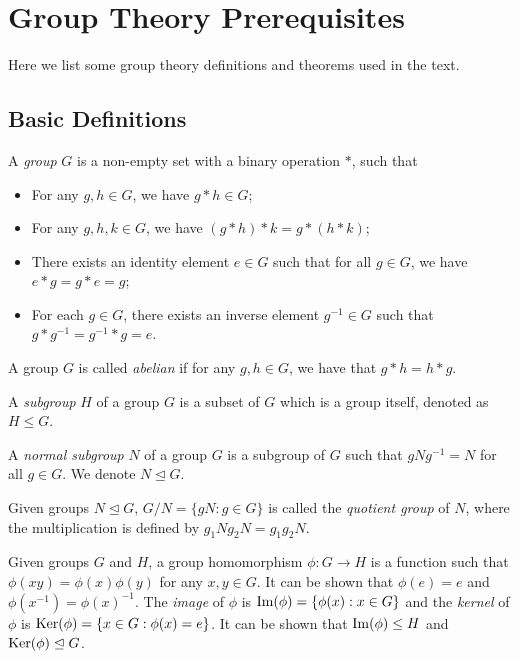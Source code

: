 \section{Group Theory Prerequisites}
Here we list some group theory definitions and theorems used in the text.

\subsection{Basic Definitions}
\begin{definition}
	A \textit{group} $G$ is a non-empty set with a binary operation $*$, such that
	\begin{itemize}
		\item For any $g, h \in G$, we have $g * h \in G$;
		\item For any $g, h, k  \in G$, we have $(g * h) * k = g * (h * k)$;
		\item There exists an identity element $e \in G$ such that for all $g \in G$, we have $e * g = g * e = g$;
		\item For each $g \in G$, there exists an inverse element $g^{-1} \in G$ such that $g * g^{-1} = g^{-1} * g = e$. 
	\end{itemize}
\end{definition}

\begin{definition}
	A group $G$ is called \textit{abelian} if for any $g, h \in G$, we have that $g * h = h * g$. 
\end{definition}

\begin{definition}
	A \textit{subgroup} $H$ of a group $G$ is a subset of $G$ which is a group itself, denoted as $H \le G$. 
\end{definition}

\begin{definition}
	A \textit{normal subgroup} $N$ of a group $G$ is a subgroup of $G$ such that $gNg^{-1} = N$ for all $g \in G$. We denote $N \trianglelefteq G$. 
\end{definition}

\begin{definition}
	Given groups $N \trianglelefteq G$, $G / N = \{g N : g \in G\}$ is called the \textit{quotient group} of $N$, where the multiplication is defined by $g_1N g_2N = g_1g_2N$. 
\end{definition}

\begin{definition}
	Given groups $G$ and $H$, a group homomorphism $\phi: G \to H$ is a function such that $\phi(xy) = \phi(x) \phi(y)$ for any $x, y \in G$. It can be shown that $\phi(e) = e$ and $\phi(x^{-1}) = \phi(x) ^ {-1}$. The \textit{image} of $\phi$ is $\operatorname{Im}(\phi) = \{\phi(x) : x\in G\}$ and the \textit{kernel} of $\phi$ is $\operatorname{Ker}(\phi) = \{x \in G : \phi(x) = e\}$. It can be shown that $\operatorname{Im}(\phi) \le H$ and $\operatorname{Ker}(\phi) \trianglelefteq G$.  
\end{definition}


